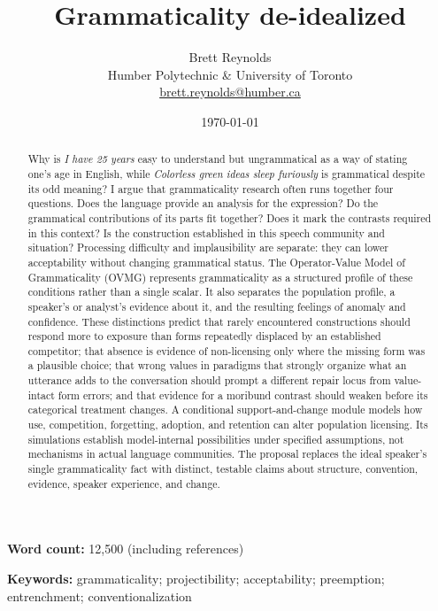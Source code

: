 \documentclass[12pt,letterpaper]{article}
\title{Grammaticality de-idealized}
\author{}
\date{}
\author{Brett Reynolds \orcidlink{0000-0003-0073-7195}\\
    Humber Polytechnic \& University of Toronto\\
    \href{mailto:brett.reynolds@humber.ca}{brett.reynolds@humber.ca}}
\date{\today}
\newcommand{\mention}[1]{\textit{#1}}
\begin{document}
\maketitle
\noindent\textbf{Word count:} 12{,}500 (including references)
\medskip

\begin{abstract}
    Why is \mention{I have 25 years} easy to understand but ungrammatical as a
    way of stating one's age in English, while
    \mention{Colorless green ideas sleep furiously} is
    grammatical despite its odd meaning? I argue that grammaticality research
    often runs together four questions. Does the language provide an analysis
    for the expression? Do the grammatical contributions of its parts fit
    together? Does it mark the contrasts required in this context? Is the
    construction established in this speech community and situation?
    Processing difficulty and implausibility are separate: they can lower
    acceptability without changing grammatical status. The Operator-Value Model
    of Grammaticality (OVMG) represents grammaticality as a structured profile
    of these conditions rather than a single scalar. It also separates the
    population profile, a speaker's or analyst's evidence about it, and the
    resulting feelings of anomaly and confidence. These distinctions predict
    that rarely encountered constructions should respond more to exposure than
    forms repeatedly displaced by an established competitor; that absence is
    evidence of non-licensing only where the missing form was a plausible
    choice; that wrong values in paradigms that strongly organize what an
    utterance adds to the conversation should prompt a different repair locus
    from value-intact form errors; and that evidence for a moribund contrast
    should weaken before its categorical treatment changes. A conditional
    support-and-change module models how use, competition, forgetting, adoption,
    and retention can alter population licensing. Its simulations establish
    model-internal possibilities under specified assumptions, not mechanisms in
    actual language communities. The proposal replaces the ideal speaker's
    single grammaticality fact with distinct, testable claims about structure,
    convention, evidence, speaker experience, and change.
\end{abstract}

\noindent\textbf{Keywords:} grammaticality; projectibility; acceptability;
preemption; entrenchment; conventionalization

\newpage
\end{document}
